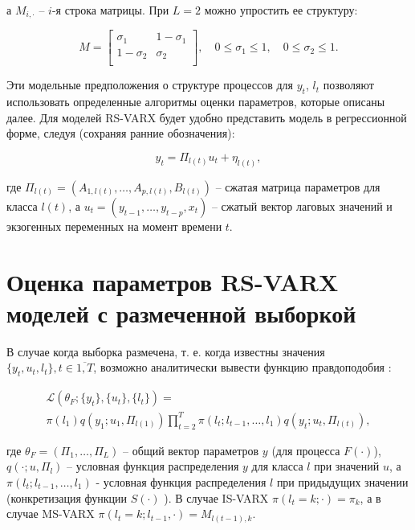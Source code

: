 \documentclass[a4paper,14pt]{extreport}
\begin{document}
а $M_{i, \cdot}$ -- $i$-я строка матрицы. При $L=2$ можно упростить ее структуру:

\begin{equation}
	M=
	\left[ {
				\begin{array}{cc}
					\sigma_{1}   & 1-\sigma_{1} \\
					1-\sigma_{2} & \sigma_{2}   \\
				\end{array}
			} \right]
	, \quad 
	0 \le \sigma_{1} \le 1
	, \quad 
	0 \le \sigma_{2} \le 1
	.
\end{equation}

Эти модельные предположения о структуре процессов для $y_t$, $l_t$ позволяют использовать определенные алгоритмы оценки параметров, которые описаны далее. Для моделей RS-VARX будет удобно представить модель в регрессионной форме, следуя \cite{malNovopMSVARX} (сохраняя ранние обозначения):

\begin{equation}
	y_t = \Pi_{l(t)} u_t + \eta_{l(t)} ,
	\label{eq:rs_varx_as_regression}
\end{equation}

\noindent
где $ \Pi_{l(t)} = (A_{1, l(t)}, \dots, A_{p, l(t)}, B_{l(t)}) $ -- сжатая матрица параметров для класса $l(t)$, 
а $ u_t = (y_{t-1}, \dots, y_{t-p}, x_{t}) $ -- сжатый вектор лаговых значений и экзогенных переменных на момент времени $t$.

\section{Оценка параметров RS-VARX моделей с размеченной выборкой}

В случае когда выборка размечена, т. е. когда известны значения $\{y_t, u_t, l_t\}, t \in \overline{1,T}$, возможно аналитически вывести функцию правдоподобия \cite{malNovopMSVARX}:

\begin{equation}
	\begin{multlined}
		\mathcal{L}(\theta_F; \{y_t\}, \{u_t\}, \{l_t\}) ={} \\
		\pi(l_1) q(y_1; u_1, \Pi_{l(1)}) 
		\prod\limits_{t=2}^{T}{ 
		\pi(l_t; l_{t-1}, \dots, l_1) q(y_t; u_t, \Pi_{l(t)}) 
		} ,
	\end{multlined}
	\label{eq:rs_varx_loglike}
\end{equation}

\noindent
где $\theta_F = (\Pi_1, \dots, \Pi_L)$ -- общий вектор параметров $y$ (для процесса $F(\cdot)$), $q(\cdot; u, \Pi_l)$ -- условная функция распределения $y$ для класса $l$ при значений $u$, а $\pi(l_t; l_{t-1}, \dots, l_1)$ - условная функция распределения $l$ при придыдущих значении (конкретизация функции $S(\cdot)$ ). В случае IS-VARX $\pi(l_t = k; \cdot) = \pi_k$, а в случае MS-VARX $\pi(l_t = k; l_{t-1}, \cdot) = M_{l(t-1), k}$.
\end{document}
